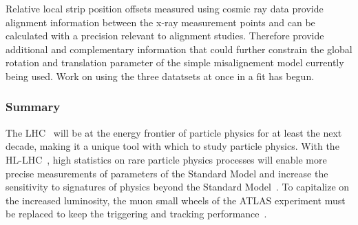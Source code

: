Relative local strip position offsets measured using cosmic ray data provide alignment information between the x-ray measurement points and can be calculated with a precision relevant to alignment studies. Therefore provide additional and complementary information that could further constrain the global rotation and translation parameter of the simple misalignement model currently being used. Work on using the three datatsets at once in a fit has begun.


\subsubsection*{Summary}

The LHC~\cite{evans_lhc_2008} will be at the energy frontier of particle physics for at least the next decade, making it a unique tool with which to study particle physics. With the HL-LHC~\cite{hl_lhc_tdr}, high statistics on rare particle physics processes will enable more precise measurements of parameters of the Standard Model and increase the sensitivity to signatures of physics beyond the Standard Model~\cite{dainese_physics_2018}. To capitalize on the increased luminosity, the muon small wheels of the ATLAS experiment must be replaced to keep the triggering and tracking performance~\cite{nsw_tdr}. 

